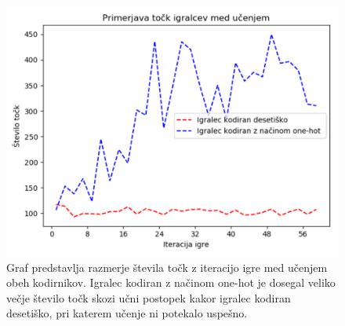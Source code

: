 \documentclass[a4paper, 12pt]{book}
\begin{document}

\begin{figure}[h]
	\begin{center}
		\includegraphics[width=1\textwidth]{photos/onehot_numeric_score.pdf}
	\end{center}
	\caption{Graf predstavlja razmerje števila točk z iteracijo igre med učenjem obeh kodirnikov.
		Igralec kodiran z načinom one-hot je dosegal veliko večje število točk skozi učni postopek kakor igralec kodiran desetiško, pri katerem učenje ni potekalo uspešno.}
	\label{onehot_numeric_score}
\end{figure}
\end{document}
